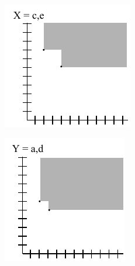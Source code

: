 \documentclass[a4paper, 10pt]{article}
\begin{document}
\begin{figure}[H]
    \centering
    \begin{subfigure}{0.35\textwidth}
        \centering
        \includegraphics[width=\linewidth]{3_sfx.pdf}
    \end{subfigure}
    \hfill
    \begin{subfigure}{0.35\textwidth}
        \centering
        \includegraphics[width=\linewidth]{3_sfy.pdf}

\end{subfigure}
\end{figure}
\end{document}
